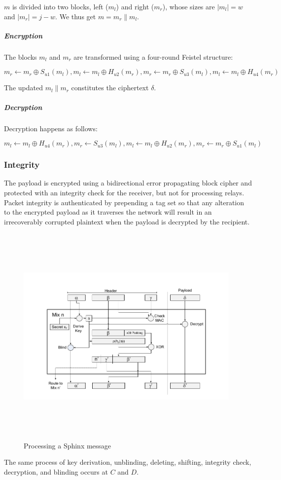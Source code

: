 $m$ is divided into two blocks, left ($m_l$) and right ($m_r$), whose sizes are $|m_l|=w$ and $|m_r|=j-w$. We thus get $m=m_r\|m_l$.
\subparagraph{Encryption}
The blocks $m_l$ and $m_r$ are transformed using a four-round Feistel structure:

$$m_r\leftarrow m_r \oplus S_{u1}(m_l), m_l\leftarrow m_l \oplus H_{u2}(m_r), m_r\leftarrow m_r\oplus S_{u3}(m_l), m_l\leftarrow m_l\oplus H_{u4}(m_r)$$

The updated $m_l\|m_r$ constitutes the ciphertext $\delta$.

\subparagraph{Decryption}
Decryption happens as follows:

$$m_l\leftarrow m_l\oplus H_{u4}(m_r), m_r\leftarrow S_{u3}(m_l), m_l\leftarrow m_l\oplus H_{u2}(m_r), m_r\leftarrow m_r\oplus S_{u1}(m_l)$$

\subsubsection{Integrity}
The payload is encrypted using a bidirectional error propagating block cipher and protected with an integrity check for the receiver, but not for processing relays. Packet integrity is authenticated by prepending a tag set so that any alteration to the encrypted payload as it traverses the network will result in an irrecoverably corrupted plaintext when the payload is decrypted by the recipient.

\begin{figure}[H]
    \centering
    \includegraphics[width=11cm,height=11cm,keepaspectratio]{../yellowpaper/images/sphinx1.png}
    \caption{Processing a Sphinx message \cite{sphinxpaper}}
    \label{fig:The processing of a Sphinx message }
\end{figure}
The same process of key derivation, unblinding, deleting, shifting, integrity check, decryption, and blinding occurs at $C$ and $D$.

